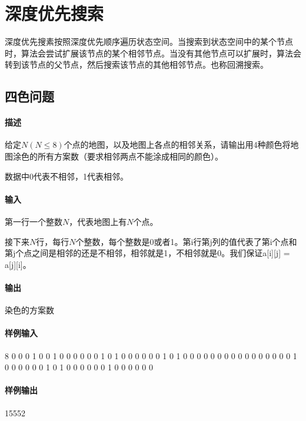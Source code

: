\chapter{深度优先搜索}
深度优先搜素按照深度优先顺序遍历状态空间。当搜索到状态空间中的某个节点时，算法会尝试扩展该节点的某个相邻节点。当没有其他节点可以扩展时，算法会转到该节点的父节点，然后搜索该节点的其他相邻节点。也称回溯搜索。

\section{四色问题} %

\subsubsection{描述}
给定$N(N \leq 8)$个点的地图，以及地图上各点的相邻关系，请输出用4种颜色将地图涂色的所有方案数（要求相邻两点不能涂成相同的颜色）。

数据中0代表不相邻，1代表相邻。

\subsubsection{输入}
第一行一个整数$N$，代表地图上有$N$个点。

接下来$N$行，每行$N$个整数，每个整数是0或者1。第i行第j列的值代表了第i个点和第j个点之间是相邻的还是不相邻，相邻就是1，不相邻就是0。我们保证a[i][j] = a[j][i]。

\subsubsection{输出}
染色的方案数

\subsubsection{样例输入}
\begin{Code}
8
0 0 0 1 0 0 1 0 
0 0 0 0 0 1 0 1 
0 0 0 0 0 0 1 0 
1 0 0 0 0 0 0 0 
0 0 0 0 0 0 0 0 
0 1 0 0 0 0 0 0 
1 0 1 0 0 0 0 0 
0 1 0 0 0 0 0 0
\end{Code}

\subsubsection{样例输出}
\begin{Code}
15552
\end{Code}

